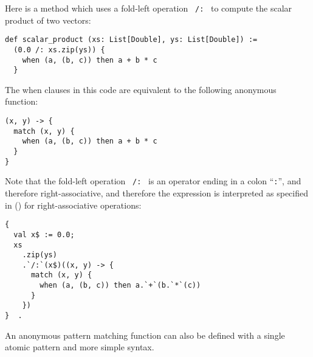\example Here is a method which uses a fold-left operation ~\lstinline!/:!~ to compute the scalar product of two vectors:
\begin{lstlisting}
def scalar_product (xs: List[Double], ys: List[Double]) := 
  (0.0 /: xs.zip(ys)) {
    when (a, (b, c)) then a + b * c
  }
\end{lstlisting}
The when clauses in this code are equivalent to the following anonymous function:
\begin{lstlisting}
(x, y) -> { 
  match (x, y) {
    when (a, (b, c)) then a + b * c
  }
}
\end{lstlisting}
Note that the fold-left operation ~\lstinline!/:!~ is an operator ending in a colon ``\lstinline!:!'', and therefore right-associative, and therefore the expression is interpreted as specified in () for right-associative operations: 

\begin{minipage}{\linewidth}
\begin{lstlisting}[mathescape=false]
{ 
  val x$ := 0.0; 
  xs
    .zip(ys)
    .`/:`(x$)((x, y) -> {
      match (x, y) {
        when (a, (b, c)) then a.`+`(b.`*`(c))
      }
    })
}  . 
\end{lstlisting}
\end{minipage}

An anonymous pattern matching function can also be defined with a single atomic pattern and more simple syntax. 










